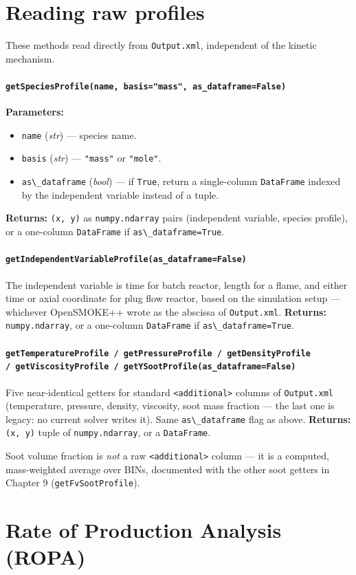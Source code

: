 \documentclass[11pt,a4paper]{report}
\newcommand{\pymethod}[1]{\subsubsection{\texttt{#1}}}
\newcommand{\returns}{\vspace{2mm}\noindent\textbf{Returns:} }
\newenvironment{params}{\vspace{1mm}\noindent\textbf{Parameters:}\begin{itemize}[leftmargin=1.1cm,label={--},itemsep=1pt,topsep=2pt]}{\end{itemize}}
\newcommand{\pkg}[1]{\lstinline|#1|}
\begin{document}
\chapter{Reading raw profiles}

These methods read directly from \pkg{Output.xml}, independent of the
kinetic mechanism.

\pymethod{getSpeciesProfile(name, basis="mass", as\_dataframe=False)}

\begin{params}
\item \pkg{name} (\textit{str}) --- species name.
\item \pkg{basis} (\textit{str}) --- \pkg{"mass"} or \pkg{"mole"}.
\item \pkg{as\_dataframe} (\textit{bool}) --- if \pkg{True}, return a
  single-column \pkg{DataFrame} indexed by the independent variable instead
  of a tuple.
\end{params}
\returns \pkg{(x, y)} as \pkg{numpy.ndarray} pairs (independent variable,
species profile), or a one-column \pkg{DataFrame} if \pkg{as\_dataframe=True}.

\pymethod{getIndependentVariableProfile(as\_dataframe=False)}

The independent variable is time for batch reactor, length for a flame, and either time or axial coordinate for plug flow reactor, based on the simulation setup ---
whichever OpenSMOKE++ wrote as the abscissa of \pkg{Output.xml}.
\returns \pkg{numpy.ndarray}, or a one-column \pkg{DataFrame} if
\pkg{as\_dataframe=True}.

\pymethod{getTemperatureProfile / getPressureProfile / getDensityProfile \\/ getViscosityProfile / getYSootProfile(as\_dataframe=False)}

Five near-identical getters for standard \pkg{<additional>} columns of
\pkg{Output.xml} (temperature, pressure, density, viscosity, soot mass
fraction --- the last one is legacy: no current solver writes it). Same
\pkg{as\_dataframe} flag as above.
\returns \pkg{(x, y)} tuple of \pkg{numpy.ndarray}, or a \pkg{DataFrame}.

Soot volume fraction is \emph{not} a raw \pkg{<additional>} column --- it is
a computed, mass-weighted average over BINs, documented with the other soot
getters in Chapter 9 (\pkg{getFvSootProfile}).

\chapter{Rate of Production Analysis (ROPA)}
\end{document}

